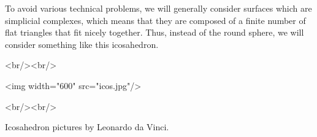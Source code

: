 To avoid various technical problems, we will generally consider 
surfaces which are simplicial complexes, which means that they
are composed of a finite number of flat triangles that fit nicely
together.  Thus, instead of the round sphere, we will consider 
something like this icosahedron.

<br/><br/>

<img width="600" src="icos.jpg"/>

<br/><br/>

Icosahedron pictures by Leonardo da Vinci.